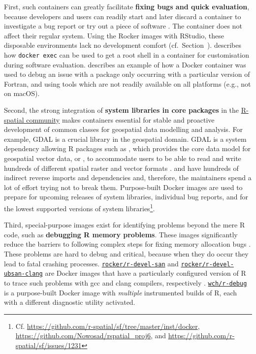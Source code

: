 First, such containers can greatly facilitate \textbf{fixing bugs and
quick evaluation}, because developers and users can readily start and
later discard a container to investigate a bug report or try out a piece
of software \citep[cf.][]{ooms_opencpu_2017}. The container does not
affect their regular system. Using the Rocker images with RStudio, these
disposable environments lack no development comfort
(cf.~Section~). \citet{ooms_opencpu_2017} describes
how \texttt{docker\ exec} can be used to get a root shell in a container
for customisation during software evaluation.
\citet{eddelbuettel_debugging_2019} describes an example of how a Docker
container was used to debug an issue with a package only occurring with
a particular version of Fortran, and using tools which are not readily
available on all platforms (e.g., not on macOS).

Second, the strong integration of \textbf{system libraries in core
packages} in the \href{https://www.r-spatial.org/}{R-spatial community}
makes containers essential for stable and proactive development of
common classes for geospatial data modelling and analysis. For example,
GDAL \citep{gdal_2019} is a crucial library in the geospatial domain.
GDAL is a system dependency allowing R packages such as ,
which provides the core data model for geospatial vector data, or
, to accommodate users to be able to read and write
hundreds of different spatial raster and vector formats
\citep{pebesma_simple_2018,cran_rgdal}.  and 
have hundreds of indirect reverse imports and dependencies and,
therefore, the maintainers spend a lot of effort trying not to break
them. Purpose-built Docker images are used to prepare for upcoming
releases of system libraries, individual bug reports, and for the lowest
supported versions of system
libraries\footnote{Cf. \href{https://github.com/r-spatial/sf/tree/master/inst/docker}{https://github.com/r-spatial/sf/tree/master/inst/docker}, \href{https://github.com/Nowosad/rspatial_proj6}{https://github.com/Nowosad/rspatial\_proj6}, and \href{https://github.com/r-spatial/sf/issues/1231}{https://github.com/r-spatial/sf/issues/1231}}.

Third, special-purpose images exist for identifying problems beyond the
mere R code, such as \textbf{debugging R memory problems}. These images
significantly reduce the barriers to following complex steps for fixing
memory allocation bugs \citep[cf. Section~4.3 in][]{core_writing_1999}.
These problems are hard to debug and critical, because when they do
occur they lead to fatal crashing processes.
\href{https://github.com/rocker-org/r-devel-san}{\texttt{rocker/r-devel-san}}
and
\href{https://github.com/rocker-org/r-devel-san-clang}{\texttt{rocker/r-devel-ubsan-clang}}
are Docker images that have a particularly configured version of R to
trace such problems with gcc and clang compilers, respectively
\citep[cf.~ for examples,][]{eddelbuettel_sanitizers_2014}.
\href{https://github.com/wch/r-debug}{\texttt{wch/r-debug}} is a
purpose-built Docker image with \emph{multiple} instrumented builds of
R, each with a different diagnostic utility activated.

